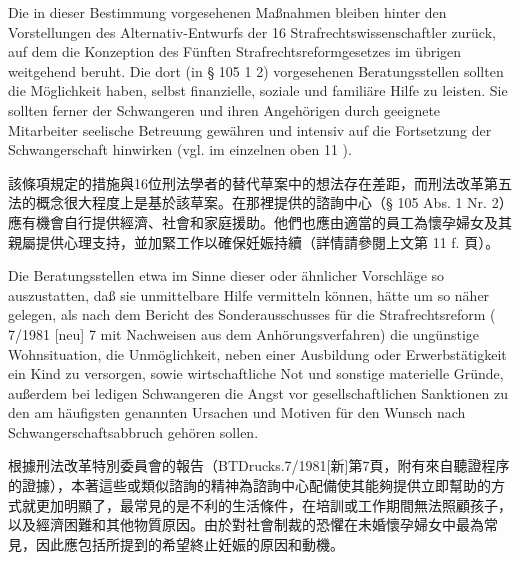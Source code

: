 \documentclass[12pt]{article}
\begin{document}
\syncleft
\begin{sourcepara}
Die in dieser Bestimmung vorgesehenen Maßnahmen bleiben hinter den Vorstellungen des Alternativ-Entwurfs der 16 Strafrechtswissenschaftler zurück, auf dem die Konzeption des Fünften Strafrechtsreformgesetzes im übrigen weitgehend beruht. Die dort (in § 105 \abbrAbs{} 1 \abbrNr{} 2) vorgesehenen Beratungsstellen sollten die Möglichkeit haben, selbst finanzielle, soziale und familiäre Hilfe zu leisten. Sie sollten ferner der Schwangeren und ihren Angehörigen durch geeignete Mitarbeiter seelische Betreuung gewähren und intensiv auf die Fortsetzung der Schwangerschaft hinwirken (vgl. im einzelnen oben \abbrS{} 11 \abbrF{}).
\end{sourcepara}
\begin{transpara}
該條項規定的措施與16位刑法學者的替代草案中的想法存在差距，而刑法改革第五法的概念很大程度上是基於該草案。在那裡提供的諮詢中心（§ 105 Abs. 1 Nr. 2）應有機會自行提供經濟、社會和家庭援助。他們也應由適當的員工為懷孕婦女及其親屬提供心理支持，並加緊工作以確保妊娠持續（詳情請參閱上文第 11 f. 頁）。
\end{transpara}

\syncleft
\begin{sourcepara}
Die Beratungsstellen etwa im Sinne dieser oder ähnlicher Vorschläge so auszustatten, daß sie unmittelbare Hilfe vermitteln können, hätte um so näher gelegen, als nach dem Bericht des Sonderausschusses für die Strafrechtsreform (\abbrBTDrucks{} 7/1981 [neu] \abbrS{} 7 mit Nachweisen aus dem Anhörungsverfahren) die ungünstige Wohnsituation, die Unmöglichkeit, neben einer Ausbildung oder Erwerbstätigkeit ein Kind zu versorgen, sowie wirtschaftliche Not und sonstige materielle Gründe, außerdem bei ledigen Schwangeren die Angst vor gesellschaftlichen Sanktionen zu den am häufigsten genannten Ursachen und Motiven für den Wunsch nach Schwangerschaftsabbruch gehören sollen.
\end{sourcepara}
\begin{transpara}
根據刑法改革特別委員會的報告（BTDrucks.7/1981[新]第7頁，附有來自聽證程序的證據），本著這些或類似諮詢的精神為諮詢中心配備使其能夠提供立即幫助的方式就更加明顯了，最常見的是不利的生活條件，在培訓或工作期間無法照顧孩子，以及經濟困難和其他物質原因。由於對社會制裁的恐懼在未婚懷孕婦女中最為常見，因此應包括所提到的希望終止妊娠的原因和動機。
\end{transpara}
\end{document}
